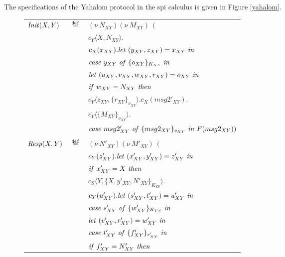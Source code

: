 \documentclass[10pt,a4paper,final,oneside,fleqn]{book}
\newcommand*{\eqdef}{\mathbin{\mathop{=}\limits^{\texttt{def}}}}
\begin{document}
\noindent
The specifications of the Yahalom protocol in the spi calculus is given in Figure \ref{yahalom}.
\begin{figure}[!tbp]
\begin{center}
\begin{tabular}{|lll|}
\hline
$\mbox{{\itshape Init\/}}(X,Y)$&$\eqdef$&$(\nu~\!N_{XY})(\nu~\!M_{XY})~~($\\
&&$\overline{c_{Y}}\langle X,N_{XY}\rangle.$\\
&&$c_{X}(x_{XY}).\mbox{{\itshape let\/} }(y_{XY},z_{XY})=x_{XY}\mbox{ {\itshape in\/}}$\\
&&$\mbox{{\itshape case\/} }y_{XY}\mbox{ {\itshape of\/} }\{o_{XY}\}_{K_{XS}}\mbox{ {\itshape in\/}}$\\
&&$\mbox{{\itshape let\/} }(u_{XY},v_{XY},w_{XY},r_{XY})=o_{XY}\mbox{ {\itshape in\/}}$\\
&&$\mbox{{\itshape if\/} }w_{XY}=N_{XY}\mbox{ {\itshape then\/}}$\\
&&$\overline{c_{Y}}\langle z_{XY},\{r_{XY}\}_{v_{XY}}\rangle.c_{X}(msg2'_{XY}).$\\
&&$\overline{c_{Y}}\langle\{M_{XY}\}_{v_{XY}}\rangle.$\\
&&$\mbox{{\itshape case\/} }msg2'_{XY}\mbox{ {\itshape of\/} }\{msg2_{XY}\}_{v_{XY}}\mbox{ {\itshape in\/} }F(msg2_{XY}))$\\&&\\
$\mbox{{\itshape Resp\/}}(X,Y)$&$\eqdef$&$(\nu~\!N'_{XY})(\nu~\!M'_{XY})~~($\\
&&$c_{Y}(z'_{XY}).\mbox{{\itshape let\/} }(x'_{XY},y'_{XY})=z'_{XY}\mbox{ {\itshape in\/}}$\\
&&$\mbox{{\itshape if\/} }x'_{XY}=X\mbox{ {\itshape then\/}}$\\
&&$\overline{c_{S}}\langle Y,\{X,y'_{XY},N'_{XY}\}_{K_{YS}}\rangle.$\\
&&$c_{Y}(u'_{XY}).\mbox{{\itshape let\/} }(s'_{XY},t'_{XY})=u'_{XY}\mbox{ {\itshape in\/}}$\\
&&$\mbox{{\itshape case\/} }s'_{XY}\mbox{ {\itshape of\/} }\{w'_{XY}\}_{K_{YS}}\mbox{ {\itshape in\/}}$\\
&&$\mbox{{\itshape let\/} }(v'_{XY},r'_{XY})=w'_{XY}\mbox{ {\itshape in\/}}$\\
&&$\mbox{{\itshape case\/} }t'_{XY}\mbox{ {\itshape of\/} }\{f'_{XY}\}_{r'_{XY}}\mbox{ {\itshape in\/}}$\\
&&$\mbox{{\itshape if\/} }f'_{XY}=N'_{XY}\mbox{ {\itshape then\/}}$\\

\end{tabular}
\end{center}
\end{figure}
\end{document}
